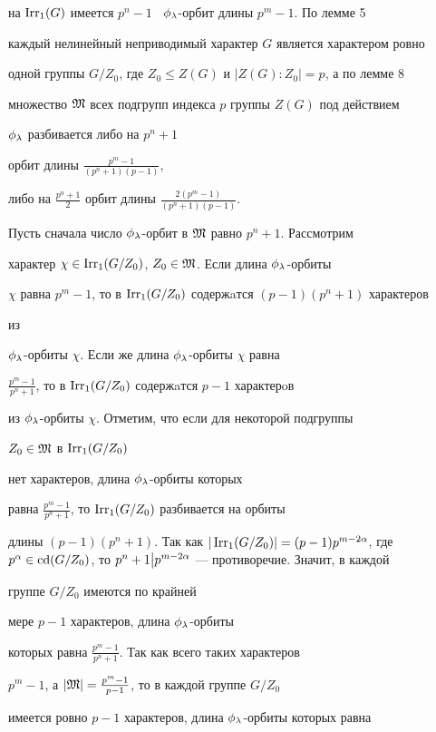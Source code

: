 на $\operatorname{Irr_1}(G)$ имеется $p^n-1$ \ $\phi_\lambda$-орбит длины $p^m-1$. По лемме 5


каждый нелинейный неприводимый характер $G$ является характером ровно


одной группы $G/Z_0$, где $Z_0\le Z(G)$ и $|Z(G):Z_0|=p$, а по лемме 8


множество $\frak M$ всех подгрупп индекса $p$ группы $Z(G)$ под действием


$\phi_\lambda$ разбивается либо на $p^n+1$


орбит длины $\frac{p^m-1}{(p^n+1)(p-1)}$,


либо на $\frac{p^n+1}{2}$ орбит длины $\frac{2(p^m-1)}{(p^n+1)(p-1)}$.





Пусть сначала число $\phi_\lambda$-орбит в $\frak M$ равно $p^n+1$. Рассмотрим


характер $\chi\in\operatorname{Irr_1}(G/Z_0)$, $Z_0\in\frak M$. Если длина $\phi_\lambda$-орбиты


$\chi$ равна $p^m-1$, то в $\operatorname{Irr_1}(G/Z_0)$ содержaтся $(p-1)(p^n+1)$ характеров


из \linebreak


$\phi_\lambda$-орбиты $\chi$. Если же длина $\phi_\lambda$-орбиты $\chi$ равна


$\frac{p^m-1}{p^n+1}$, то в $\operatorname{Irr_1}(G/Z_0)$ содержaтся $p-1$ характерoв


из $\phi_\lambda$-орбиты $\chi$. Отметим, что если для некоторой подгруппы


$Z_0\in\frak M$ в $\operatorname{Irr_1}(G/Z_0)$


нет характеров, длина $\phi_\lambda$-орбиты которых


равна $\frac{p^m-1}{p^n+1}$, то $\operatorname{Irr_1}(G/Z_0)$ разбивается на орбиты


длины $(p-1)(p^n+1)$. Так как $|\Irr(G/Z_0)|=(p-1)p^{m-2\al}$, где $p^\al\in


\cdeg(G/Z_0)$, то $p^n+1\bigl|p^{m-2\al}$ --- противоречие. Значит, в каждой 


группе $G/Z_0$ имеются по крайней


мере $p-1$ характеров, длина $\phi_\lambda$-орбиты


которых равна $\frac{p^m-1}{p^n+1}$. Так как всего таких характеров 


$p^m-1$, а $|\frak M|=\frac{p^m-1}{p-1}$, то в каждой группе $G/Z_0$ 


имеется ровно $p-1$ характеров, длина $\phi_\lambda$-орбиты которых равна 


